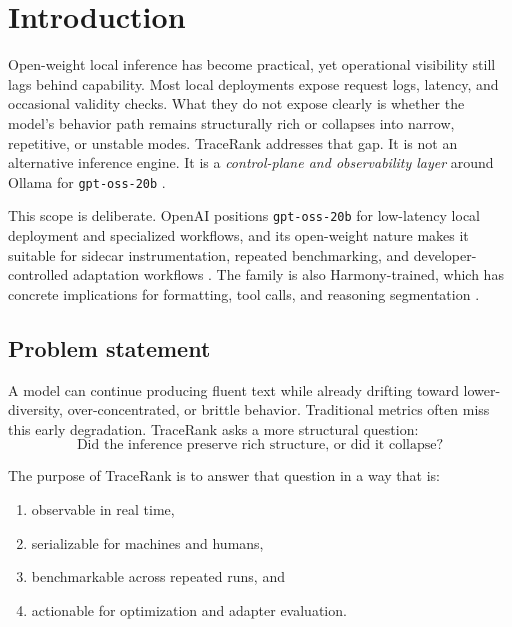     \section{Introduction}
    Open-weight local inference has become practical, yet operational visibility still lags behind capability. Most local deployments expose request logs, latency, and occasional validity checks. What they do not expose clearly is whether the model's behavior path remains structurally rich or collapses into narrow, repetitive, or unstable modes. TraceRank addresses that gap. It is not an alternative inference engine. It is a \emph{control-plane and observability layer} around Ollama for \texttt{gpt-oss-20b} \cite{openai_ollama_guide}.
    
    This scope is deliberate. OpenAI positions \texttt{gpt-oss-20b} for low-latency local deployment and specialized workflows, and its open-weight nature makes it suitable for sidecar instrumentation, repeated benchmarking, and developer-controlled adaptation workflows \cite{openai_gptoss20b}. The family is also Harmony-trained, which has concrete implications for formatting, tool calls, and reasoning segmentation \cite{openai_harmony,openai_verify}.
    
    \subsection{Problem statement}
    A model can continue producing fluent text while already drifting toward lower-diversity, over-concentrated, or brittle behavior. Traditional metrics often miss this early degradation. TraceRank asks a more structural question:
    \begin{equation}
    \text{Did the inference preserve rich structure, or did it collapse?}
    \end{equation}
    
    The purpose of TraceRank is to answer that question in a way that is:
    \begin{enumerate}[label=\arabic*.]
      \item observable in real time,
      \item serializable for machines and humans,
      \item benchmarkable across repeated runs, and
      \item actionable for optimization and adapter evaluation.
    \end{enumerate}
    
